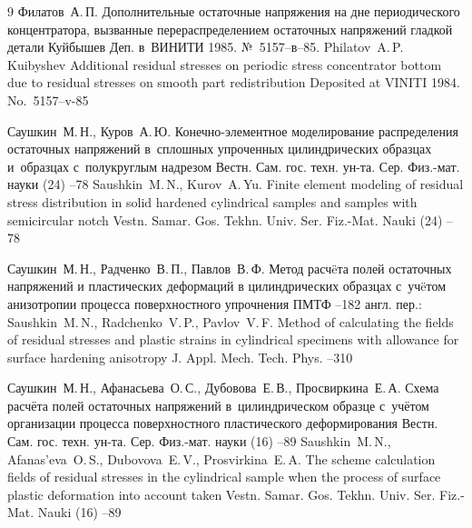 \begin{thebibliography}{9}
\by Филатов~А.\,П.
\preprint Дополнительные остаточные напряжения на дне периодического концентратора, вызванные перераспределением остаточных напряжений гладкой детали 
\publaddr Куйбышев
\miscnote Деп. в~ВИНИТИ 1985. №~5157--в--85. 
\misctransl
\by Philatov~A.\,P.
\publaddr Kuibyshev
\preprint Additional residual stresses on  periodic stress concentrator bottom  due to  residual stresses on smooth part  redistribution 
\miscnote Deposited at VINITI 1984. No.~5157--v-85

\by Саушкин~М.\,Н., Куров~А.\,Ю.
\paper Конечно-элементное моделирование распределения остаточных напряжений в~сплошных упроченных цилиндрических образцах и~образцах с~полукруглым надрезом
\jour Вестн. Сам. гос. техн. ун-та. Сер. Физ.-мат. науки
(24)
--78
\misctransl
\by Saushkin~M.\,N., Kurov~A.\,Yu.
\paper Finite element modeling of residual stress distribution in solid hardened cylindrical samples and samples with semicircular notch
\jour Vestn. Samar. Gos. Tekhn. Univ. Ser. Fiz.-Mat. Nauki
(24)
--78

\by Саушкин~М.\,Н., Радченко~В.\,П., Павлов~В.\,Ф.
\paper Метод расч\"eта полей остаточных напряжений и пластических деформаций в цилиндрических образцах с~уч\"eтом анизотропии процесса поверхностного упрочнения
\jour ПМТФ
--182
\transl
англ. пер.:~
\by Saushkin~M.\,N., Radchenko~V.\,P., Pavlov~V.\,F.
\paper Method of calculating the fields of residual stresses and plastic strains in cylindrical specimens with allowance for surface hardening anisotropy
\jour J. Appl. Mech. Tech. Phys.
--310

\by Саушкин~М.\,Н., Афанасьева~О.\,С., Дубовова~Е.\,В., Просвиркина~Е.\,А.
\paper Схема расчёта полей остаточных напряжений в~цилиндрическом образце с~учётом организации процесса поверхностного пластического деформирования
\jour Вестн. Сам. гос. техн. ун-та. Сер. Физ.-мат. науки
(16)
--89
\misctransl
\by Saushkin~M.\,N., Afanas'eva~O.\,S., Dubovova~E.\,V., Prosvirkina~E.\,A.
\paper The scheme calculation fields of residual stresses in the cylindrical sample when the process of surface plastic deformation into account taken
\jour Vestn. Samar. Gos. Tekhn. Univ. Ser. Fiz.-Mat. Nauki
(16)
--89

\end{thebibliography}






\noindent
\hskip6.5cm \thedate \par\noindent
\hskip6.5cm\therevdate


\makeengtitle


\renewcommand{\baselinestretch}{0.9}

\newpage
%
%